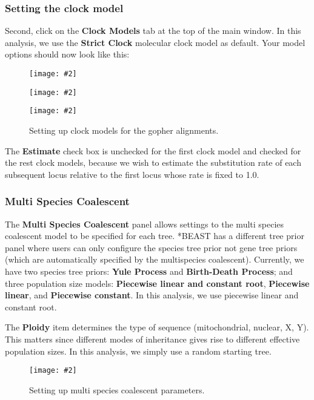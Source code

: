 \documentclass{article}
\newcommand{\includeimage}[2][]{%
\texttt{[image: \#2]}
}
\begin{document}
\subsubsection*{Setting the clock model}

Second, click on the {\bf Clock Models} tab at the top of the
main window. In this analysis, we use the \textbf{Strict Clock} molecular clock model as default.
Your model options should now look like this: 

\begin{figure}
\centering
\includeimage[scale=0.4,clip=true,trim=0 450 0 0]{figures/BEAUti_ClockModel1}

\centering
\includeimage[scale=0.4,clip=true,trim=0 450 0 0]{figures/BEAUti_ClockModel2}

\centering
\includeimage[scale=0.4,clip=true,trim=0 450 0 0]{figures/BEAUti_ClockModel3}

\caption{\label{fig.clockmodel} Setting up clock models for the gopher alignments.}
\end{figure}


The \textbf{Estimate} check box is unchecked for the first clock model and checked for the rest clock models, because we wish to estimate the substitution rate of each subsequent locus relative to the first locus whose rate is fixed to 1.0. 

\subsubsection*{Multi Species Coalescent}

The {\bf Multi Species Coalescent} panel allows settings to the multi species coalescent model to be specified for each tree. *BEAST has a different tree prior panel where users can only configure the species tree prior not gene tree priors (which are automatically specified by the multispecies coalescent). Currently, we have two species tree priors: \textbf{Yule Process} and \textbf{Birth-Death Process}; and three population size models: \textbf{Piecewise linear and constant root}, \textbf{Piecewise linear}, and \textbf{Piecewise constant}. 
In this analysis, we use {piecewise linear and constant root}.

The \textbf{Ploidy} item determines the type of sequence (mitochondrial, nuclear, X, Y). This matters since different modes of inheritance gives rise to different effective population sizes. In this analysis, we simply use a random starting tree. 

\begin{figure}
\centering
\includeimage[scale=0.4,clip=true,trim=0 150 0 0]{figures/BEAUti_MSP}

\caption{\label{fig.MSP} Setting up multi species coalescent parameters.}
\end{figure}
\end{document}
